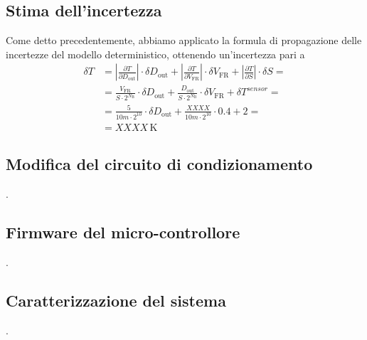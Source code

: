 \documentclass[a4paper]{article}
\newcommand\abs[1]{\left|#1\right|}
\begin{document}
		\subsection{Stima dell'incertezza}
			Come detto precedentemente, abbiamo applicato la formula di propagazione delle incertezze del modello deterministico, ottenendo un'incertezza pari a
			\begin{equation*}
				\begin{split}
					\delta T &= \abs{\frac{\partial T}{\partial D_{\mathrm{out}}}} \cdot \delta D_{\mathrm{out}} + \abs{\frac{\partial T}{\partial V_{\mathrm{FR}}}} \cdot \delta V_{\mathrm{FR}} + \abs{\frac{\partial T}{\partial S}} \cdot \delta S = \\
							 &= \frac{V_{\mathrm{FR}}}{S \cdot 2^{N_{\mathrm{B}}}} \cdot \delta D_{\mathrm{out}} + \frac{D_{\mathrm{out}}}{S \cdot 2^{N_{\mathrm{B}}}} \cdot \delta V_{\mathrm{FR}} + \delta T^{sensor} = \\
							 &= \frac{5}{10m \cdot 2^{10}} \cdot \delta D_{\mathrm{out}} + \frac{XXXX}{10m \cdot 2^{10}} \cdot 0.4 + 2 = \\
							 &= XXXX \, \mathrm{K}
				\end{split}
			\end{equation*}
		\subsection{Modifica del circuito di condizionamento}
			.
		\subsection{Firmware del micro-controllore}
			.
		\subsection{Caratterizzazione del sistema}
			.
\end{document}
